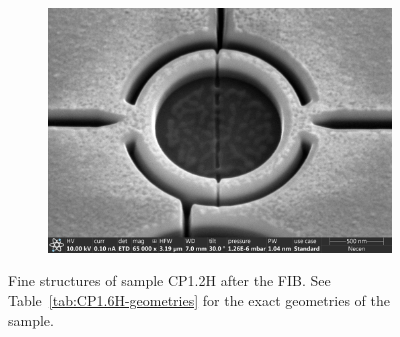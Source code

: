 \begin{figure}[ht]
\begin{subfigure}[t]{0.3\textwidth}
	\end{subfigure}
	\hfill
	\begin{subfigure}[t]{0.3\textwidth}
		\centering
		\includegraphics[width=\textwidth]{figures/samples/CP1/CP1.2H_SEM_SQUID.jpg}
	\end{subfigure}

	\caption{Fine structures of sample CP1.2H after the FIB. See Table~\ref{tab:CP1.6H-geometries} for the exact geometries of the sample.}
	\label{fig:CP1.2H-SEM-images}
\end{figure}

